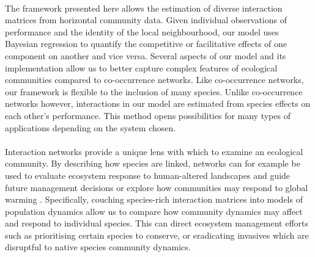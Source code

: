 \documentclass[a4,12pt]{article}
\begin{document}


    \paragraph{} 
    The framework presented here allows the estimation of diverse interaction matrices from horizontal community data. Given individual observations of performance and the identity of the local neighbourhood, our model uses Bayesian regression to quantify the competitive or facilitative effects of one component on another and vice versa. Several aspects of our model and its implementation allow us to better capture complex features of ecological communities compared to co-occurrence networks. Like co-occurrence networks, our framework is flexible to the inclusion of many species. Unlike co-occurrence networks however, interactions in our model are estimated from species effects on each other's performance.  This method opens possibilities for many types of applications depending on the system chosen.





 

    \paragraph{}
    Interaction networks provide a unique lens with which to examine an ecological community. By describing how species are linked, networks can for example be used to evaluate ecosystem response to human-altered landscapes and guide future management decisions \parencite{Ross2011} or explore how communities may respond to global warming \parencite{Gorman2019}. Specifically, couching species-rich interaction matrices into models of population dynamics allow us to compare how community dynamics may affect and respond to individual species. This can direct ecosystem management efforts such as prioritising certain species to conserve, or eradicating invasives which are disruptful to native species community dynamics. 
\end{document}
